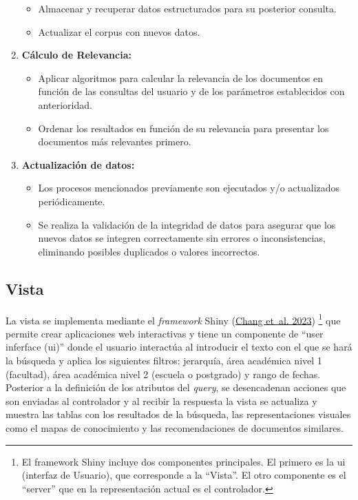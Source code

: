 \documentclass[
  12pt,
  openany]{book}
\begin{document}
\begin{enumerate}
  \begin{itemize}
  \item
    Almacenar y recuperar datos estructurados para su posterior consulta.
  \item
    Actualizar el corpus con nuevos datos.
  \end{itemize}
\item
  \textbf{Cálculo de Relevancia:}

  \begin{itemize}
  \item
    Aplicar algoritmos para calcular la relevancia de los documentos en función de las consultas del usuario y de los parámetros establecidos con anterioridad.
  \item
    Ordenar los resultados en función de su relevancia para presentar los documentos más relevantes primero.
  \end{itemize}
\item
  \textbf{Actualización de datos:}

  \begin{itemize}
  \item
    Los procesos mencionados previamente son ejecutados y/o actualizados periódicamente.
  \item
    Se realiza la validación de la integridad de datos para asegurar que los nuevos datos se integren correctamente sin errores o inconsistencias, eliminando posibles duplicados o valores incorrectos.
  \end{itemize}
\end{enumerate}

\hypertarget{vista}{%
\subsection{\texorpdfstring{\textbf{Vista}}{Vista}}\label{vista}}

La vista se implementa mediante el \emph{framework} Shiny (\protect\hyperlink{ref-shiny}{Chang et~al. 2023}) \footnote{El framework Shiny incluye dos componentes principales. El primero es la ui (interfaz de Usuario), que corresponde a la ``Vista''. El otro componente es el ``server'' que en la representación actual es el controlador.} que permite crear aplicaciones web interactivas y tiene un componente de ``user inferface (ui)'' donde el usuario interactúa al introducir el texto con el que se hará la búsqueda y aplica los siguientes filtros: jerarquía, área académica nivel 1 (facultad), área académica nivel 2 (escuela o postgrado) y rango de fechas. Posterior a la definición de los atributos del \emph{query}, se desencadenan acciones que son enviadas al controlador y al recibir la respuesta la vista se actualiza y muestra las tablas con los resultados de la búsqueda, las representaciones visuales como el mapas de conocimiento y las recomendaciones de documentos similares.
\end{document}
